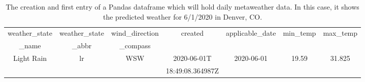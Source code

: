 \documentclass[]{article}
\begin{document}
\begin{table}[!ht]
	\begin{center}
		\caption{The creation and first entry of a Pandas dataframe which will hold daily metaweather data.  In this case, it shows the predicted weather for 6/1/2020 in Denver, CO.}
		\label{tab:table1}
		\begin{tabular}{|c|c|c|c|c|c|c|}
			\hline
			weather\_state&weather\_state&wind\_direction&created&applicable\_date&min\_temp&max\_temp\\
			\_name&\_abbr&\_compass&&&&\\
			\hline
			Light Rain	&lr&	WSW	&2020-06-01T	&2020-06-01 &19.59	& 31.825\\
						&&		&18:49:08.364987Z	&&	& \\
			\hline
		\end{tabular}
	\end{center}
\end{table}
\end{document}
